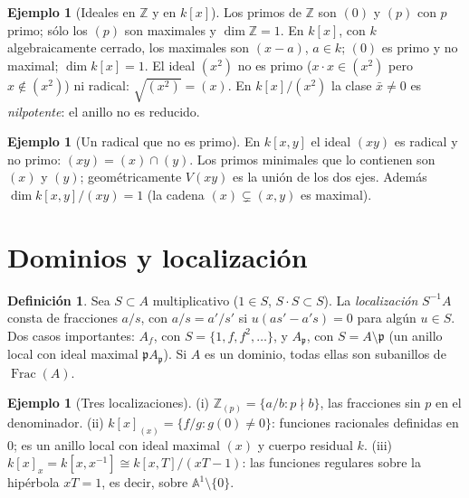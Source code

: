 \documentclass[11pt,a4paper,oneside]{book}
\newcommand{\Frac}{\operatorname{Frac}}
\newcommand{\A}{\mathbb{A}}
\newcommand{\ZZ}{\mathbb{Z}}
\theoremstyle{plain}
\theoremstyle{definition}
\newtheorem{definicion}[teorema]{Definición}
\newtheorem{ejemplo}[teorema]{Ejemplo}
\theoremstyle{remark}
\begin{document}
\begin{ejemplo}[{Ideales en $\ZZ$ y en $k[x]$}]
Los primos de $\ZZ$ son $(0)$ y $(p)$ con $p$ primo; sólo los $(p)$ son maximales y $\dim\ZZ=1$. En $k[x]$, con $k$ algebraicamente cerrado, los maximales son $(x-a)$, $a\in k$; $(0)$ es primo y no maximal; $\dim k[x]=1$. El ideal $(x^2)$ no es primo ($x\cdot x\in(x^2)$ pero $x\notin(x^2)$) ni radical: $\sqrt{(x^2)}=(x)$. En $k[x]/(x^2)$ la clase $\bar x\ne0$ es \emph{nilpotente}: el anillo no es reducido.
\end{ejemplo}

\begin{ejemplo}[Un radical que no es primo]
En $k[x,y]$ el ideal $(xy)$ es radical y no primo: $(xy)=(x)\cap(y)$. Los primos minimales que lo contienen son $(x)$ y $(y)$; geométricamente $V(xy)$ es la unión de los dos ejes. Además $\dim k[x,y]/(xy)=1$ (la cadena $(x)\subsetneq(x,y)$ es maximal).
\end{ejemplo}

\section{Dominios y localización}

\begin{definicion}
Sea $S\subset A$ multiplicativo ($1\in S$, $S\cdot S\subset S$). La \emph{localización} $S^{-1}A$ consta de fracciones $a/s$, con $a/s=a'/s'$ si $u(as'-a's)=0$ para algún $u\in S$. Dos casos importantes: $A_f$, con $S=\{1,f,f^2,\dots\}$, y $A_{\mathfrak p}$, con $S=A\setminus\mathfrak p$ (un anillo local con ideal maximal $\mathfrak pA_{\mathfrak p}$). Si $A$ es un dominio, todas ellas son subanillos de $\Frac(A)$.
\end{definicion}

\begin{ejemplo}[Tres localizaciones]
(i) $\ZZ_{(p)}=\{a/b: p\nmid b\}$, las fracciones sin $p$ en el denominador. (ii) $k[x]_{(x)}=\{f/g: g(0)\ne0\}$: funciones racionales definidas en $0$; es un anillo local con ideal maximal $(x)$ y cuerpo residual $k$. (iii) $k[x]_x=k[x,x^{-1}]\cong k[x,T]/(xT-1)$: las funciones regulares sobre la hipérbola $xT=1$, es decir, sobre $\A^1\setminus\{0\}$.
\end{ejemplo}
\end{document}
